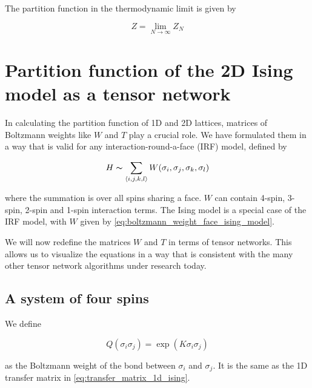 The partition function in the thermodynamic limit is given by

\begin{equation}
  Z = \lim_{N \to \infty} Z_N
\end{equation}



\section{Partition function of the 2D Ising model as a tensor network}
In calculating the partition function of 1D and 2D lattices, matrices of Boltzmann weights
like $W$ and $T$ play a crucial role. We have formulated them in a way that is valid for
any interaction-round-a-face (IRF) model, defined by

\begin{equation}
  H \thicksim \sum_{\langle i, j, k, l \rangle} W(\sigma_i, \sigma_j, \sigma_k,
  \sigma_l)
\end{equation}

where the summation is over all spins sharing a face. $W$ can contain 4-spin,
3-spin, 2-spin and 1-spin interaction terms. The Ising model is a special case of the IRF
model, with $W$ given by \autoref{eq:boltzmann_weight_face_ising_model}.

We will now redefine the matrices $W$ and $T$ in terms of tensor networks. This allows us
to visualize the equations in a way that is consistent with the many other tensor network
algorithms under research today.


\subsection{A system of four spins}

We define

\begin{equation}
  Q(\sigma_i \sigma_j) = \exp(K \sigma_i \sigma_j)
\end{equation}

as the Boltzmann weight of the bond between $\sigma_i$ and $\sigma_j$. It is the
same as the 1D transfer matrix in \autoref{eq:transfer_matrix_1d_ising}.

